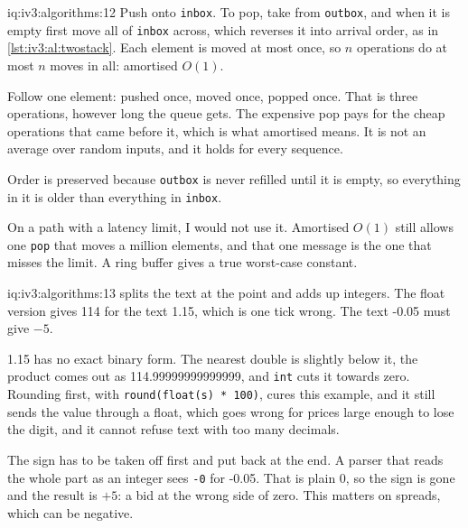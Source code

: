 \begin{solution}{iq:iv3:algorithms:12}
Push onto \texttt{inbox}. To pop, take from \texttt{outbox}, and when it is empty first move all of \texttt{inbox} across, which reverses it into arrival order, as in \cref{lst:iv3:al:twostack}. Each element is moved at most once, so $n$ operations do at most $n$ moves in all: amortised $O(1)$.
\label{lst:iv3:al:twostack}

Follow one element: pushed once, moved once, popped once. That is three operations, however long the queue gets. The expensive pop pays for the cheap operations that came before it, which is what amortised means. It is not an average over random inputs, and it holds for every sequence.

Order is preserved because \texttt{outbox} is never refilled until it is empty, so everything in it is older than everything in \texttt{inbox}.

On a path with a latency limit, I would not use it. Amortised $O(1)$ still allows one \texttt{pop} that moves a million elements, and that one message is the one that misses the limit. A ring buffer gives a true worst-case constant.

\end{solution}

\begin{solution}{iq:iv3:algorithms:13}
 splits the text at the point and adds up integers. The float version gives 114 for the text 1.15, which is one tick wrong. The text -0.05 must give $-5$.
\label{lst:iv3:al:ticks}

1.15 has no exact binary form. The nearest double is slightly below it, the product comes out as 114.99999999999999, and \texttt{int} cuts it towards zero. Rounding first, with \texttt{round(float(s) * 100)}, cures this example, and it still sends the value through a float, which goes wrong for prices large enough to lose the digit, and it cannot refuse text with too many decimals.

The sign has to be taken off first and put back at the end. A parser that reads the whole part as an integer sees \texttt{-0} for -0.05. That is plain 0, so the sign is gone and the result is $+5$: a bid at the wrong side of zero. This matters on spreads, which can be negative.

\end{solution}

